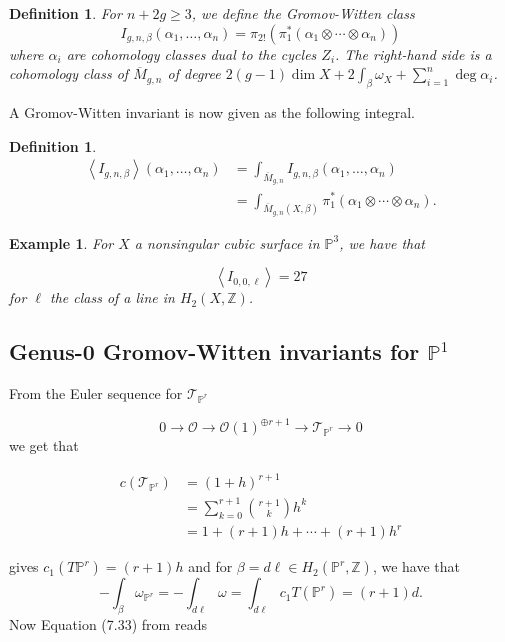 \documentclass{amsart}
\newtheorem{example}[theorem]{Example}
\newtheorem{definition}[theorem]{Definition}
\newcommand{\PP}{\mathbb{P}}\newcommand{\A}{\mathbb{A}}\newcommand{\Z}{\mathbb{Z}}\newcommand{\C}{\mathbb{C}}\newcommand{\N}{\mathbb{N}}\newcommand{\T}{\mathbb{T}}
\begin{document}
\begin{definition} For $n+2g\geq 3$, we define the Gromov-Witten class \[ I_{g,n,\beta}(\alpha_1, \dots, \alpha_n) = \pi_{2!}(\pi_1^*(\alpha_1 \otimes \cdots \otimes \alpha_n)) \] where $\alpha_i$ are cohomology classes dual to the cycles $Z_i$. The right-hand side is a cohomology class of $\overline{M}_{g,n}$ of degree $2(g-1)\dim X + 2\int_\beta \omega_X + \sum_{i=1}^n \deg \alpha_i$. \end{definition}

A Gromov-Witten invariant is now given as the following integral.

\begin{definition}
    \begin{align*} \left< I_{g,n,\beta}\right>(\alpha_1,\dots, \alpha_n) &= \int_{\overline{M}_{g,n}} I_{g,n,\beta}(\alpha_1,\dots, \alpha_n) \\
    &= \int_{\overline{M}_{g,n}(X,\beta)} \pi_1^*(\alpha_1\otimes \cdots \otimes \alpha_n). \end{align*} 
\end{definition}

\begin{example} For $X$ a nonsingular cubic surface in $\PP^3$, we have that 

\[ \left< I_{0,0,\ell}\right> = 27 \] for $\ell$ the class of a line in $H_2(X,\Z)$.  \end{example} 


\subsection{Genus-0 Gromov-Witten invariants for $\PP^1$}
\label{subsec: GWInvtsP1}


From the Euler sequence for $\mathcal{T}_{\PP^r}$ 



\[ 0 \rightarrow \mathcal{O} \rightarrow \mathcal{O}(1)^{\oplus r+1} \rightarrow \mathcal{T}_{\mathbb{P}^r} \rightarrow 0\] we get that 


\begin{align*}c(\mathcal{T}_{\PP^r}) &= (1+h)^{r+1} \\ &= \sum_{k=0}^{r+1} \binom{r+1}{k} h^k\\
&= 1 + (r+1)h + \cdots + (r+1)h^r \end{align*} 

gives $c_1(T\PP^r) = (r+1)h$ and for $\beta = d\ell \in H_2(\PP^r,\Z)$, we have that $$-\int_\beta \omega_{\PP^r} = -\int_{d\ell} \omega = \int_{d\ell} c_1 T(\mathbb{P}^r) = (r+1)d.$$ Now Equation (7.33) from \cite{coxkatxMSAG} reads 
\end{document}
